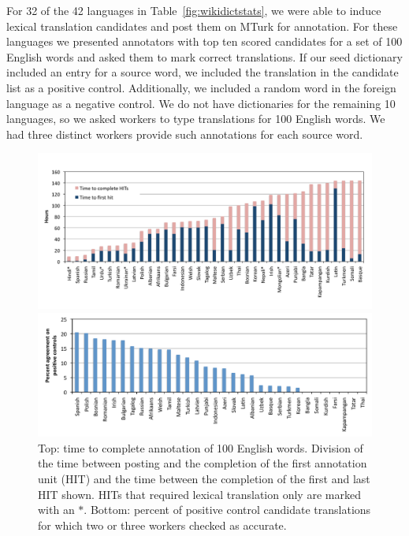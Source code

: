 \documentclass{article}
\newcommand{\tabref}[1]{Table~\ref{#1}}
\begin{document}
For 32 of the 42 languages in \tabref{fig:wikidictstats}, we were able to induce lexical translation candidates and post them on MTurk for annotation. For these languages we presented annotators with top ten scored candidates for a set of 100 English words and asked them to mark correct translations. If our seed dictionary included an entry for a source word, we included the translation in the candidate list as a positive control. Additionally, we included a random word in the foreign language as a negative control.  We do not have dictionaries for the remaining 10 languages, so we asked workers to type translations for 100 English words. We had three distinct workers provide such annotations for each source word. \\ 

\begin{figure}[h!]
\centerline{\mbox{\includegraphics[width=5in]{figures/exp4/time}}}
\centerline{\mbox{\includegraphics[width=5in]{figures/exp4/controls}}}
\caption{Top: time to complete annotation of 100 English words.  Division of the time between posting and the completion of the first annotation unit (HIT) and the time between the completion of the first and last HIT shown. HITs that required lexical translation only are marked with an $*$. Bottom: percent of positive control candidate translations for which two or three workers checked as accurate.}
\label{fig:exp4}
\end{figure}
\end{document}

